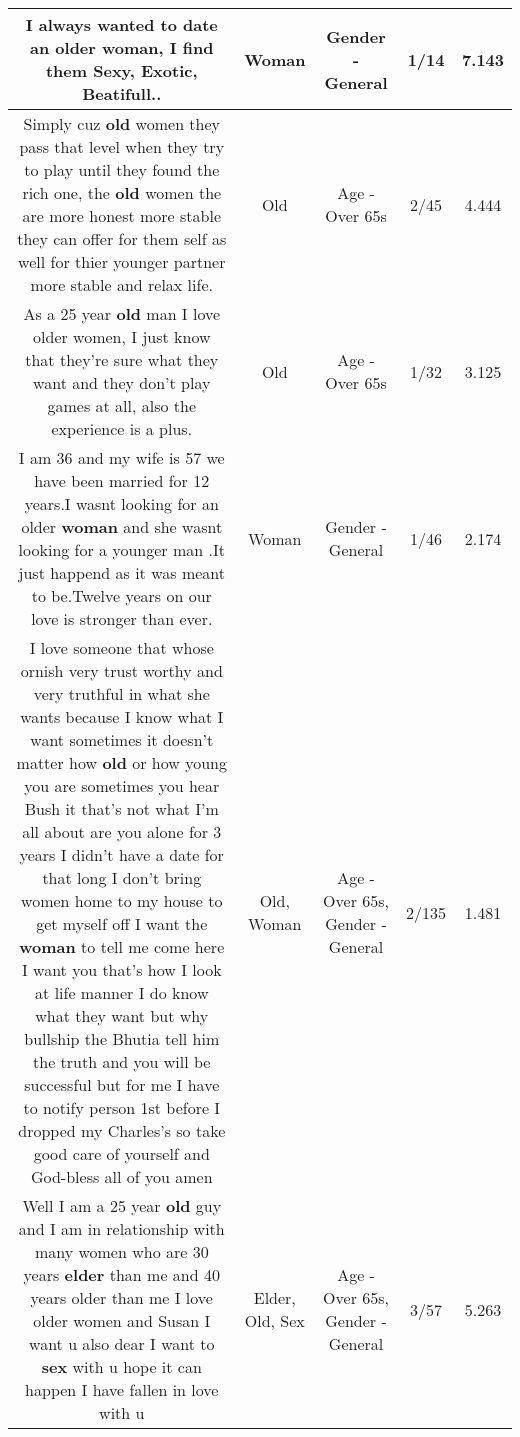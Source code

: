 \documentclass[11pt]{article}
\newlength\mylength
\begin{document}
\begin{center}
\begin{longtable}{|C{.65\mylength}|C{.30\mylength}|C{.12\mylength}|C{.12\mylength}|C{.12\mylength}|}
  \small I always wanted to date an  older \textbf{woman}, I find them Sexy, Exotic, Beatifull..\normalsize   & Woman & Gender - General & 1/14 & 7.143 \\  \hline
  \small Simply cuz \textbf{old} women they pass that level when they try to play until they found the rich one, the \textbf{old} women the are more honest more stable they can offer for them self as well for thier younger partner more stable and relax life.\normalsize   & Old & Age - Over 65s & 2/45 & 4.444 \\  \hline
  \small As a 25 year \textbf{old} man I love older women, I just know that they're sure what they want and they don't play games at all, also the experience is a plus.\normalsize   & Old & Age - Over 65s & 1/32 & 3.125 \\  \hline
  \small I am 36 and my wife is 57 we have been married for 12 years.I wasnt looking for an older \textbf{woman} and she wasnt looking for a younger man .It just happend as it was meant to be.Twelve years on our love is stronger than ever.\normalsize   & Woman & Gender - General & 1/46 & 2.174 \\  \hline
  \small I love someone that whose ornish very trust worthy and very truthful in what she wants because I know what I want sometimes it doesn't matter how \textbf{old} or how young you are sometimes you hear Bush it that's not what I'm all about are you alone for 3 years I didn't have a date for that long I don't bring women home to my house to get myself off I want the \textbf{woman} to tell me come here I want you that's how I look at life manner I do know what they want but why bullship the Bhutia tell him the truth and you will be successful but for me I have to notify person 1st before I dropped my Charles's so take good care of yourself and God-bless all of you amen\normalsize   & Old, Woman & Age - Over 65s, Gender - General & 2/135 & 1.481 \\  \hline
  \small Well I am a 25 year \textbf{old} guy and I am in relationship with many women who are 30 years \textbf{elder} than me and 40 years older than me I love older women and Susan I want u also dear I want to \textbf{sex} with u hope it can happen I have fallen in love with u\normalsize   & Elder, Old, Sex & Age - Over 65s, Gender - General & 3/57 & 5.263 \\  \hline

\end{longtable}
\end{center}
\end{document}
